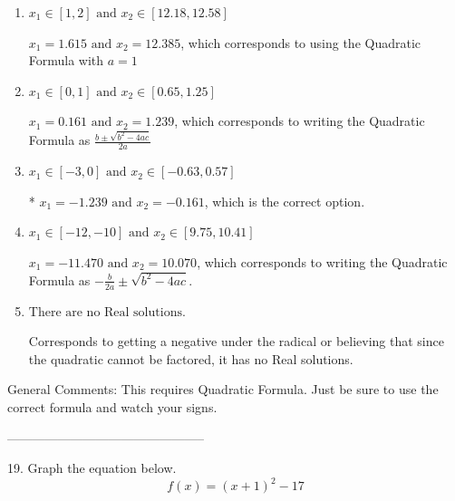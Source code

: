 \documentclass{extbook}[14pt]
\begin{document}
\begin{enumerate}[label=\Alph*.] 
\item $ x_1 \in [1, 2] \text{ and } x_2 \in [12.18, 12.58] $ 

  $x_1 = 1.615 \text{ and } x_2 = 12.385$, which corresponds to using the Quadratic Formula with $a=1$ 
\item $ x_1 \in [0, 1] \text{ and } x_2 \in [0.65, 1.25] $ 

  $x_1 = 0.161 \text{ and } x_2 = 1.239$, which corresponds to writing the Quadratic Formula as $\frac{b \pm \sqrt{b^2 - 4ac}}{2a}$ 
\item $ x_1 \in [-3, 0] \text{ and } x_2 \in [-0.63, 0.57] $ 

 * $x_1 = -1.239 \text{ and } x_2 = -0.161$, which is the correct option. 
\item $ x_1 \in [-12, -10] \text{ and } x_2 \in [9.75, 10.41] $ 

  $x_1 = -11.470 \text{ and } x_2 = 10.070$, which corresponds to writing the Quadratic Formula as $-\frac{b}{2a} \pm \sqrt{b^2 - 4ac}$. 
\item $ \text{There are no Real solutions.} $ 

 Corresponds to getting a negative under the radical or believing that since the quadratic cannot be factored, it has no Real solutions. 
\end{enumerate} 
 
General Comments: This requires Quadratic Formula. Just be sure to use the correct formula and watch your signs.

-----------------------------------------------

19. Graph the equation below.
\[ f(x) = (x+1)^2 - 17 \] 
\end{document}
